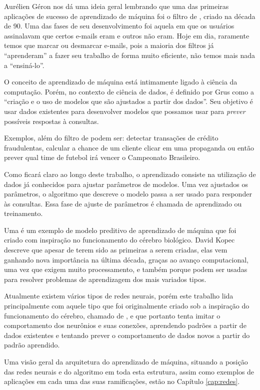 Aurélien Géron \citep{hands} nos dá uma ideia geral lembrando que uma das primeiras aplicações de sucesso de aprendizado de máquina foi o filtro de , criado na década de 90. Uma das fases de seu desenvolvimento foi aquela em que os usuários assinalavam que certos e-mails eram  e outros não eram. Hoje em dia, raramente temos que marcar ou desmarcar e-mails, pois a maioria dos filtros já ``aprenderam'' a fazer seu trabalho de forma muito eficiente, não temos mais nada a ``ensiná-lo''.

O conceito de aprendizado de máquina está intimamente ligado à ciência da computação. Porém, no contexto de ciência de dados, é definido por Grus \citep{data} como a ``criação e o uso de modelos que são ajustados a partir dos dados''. Seu objetivo é usar dados existentes para desenvolver modelos que possamos usar para \emph{prever} possíveis respostas à consultas. 

Exemplos, além do filtro de  podem ser: detectar transações de crédito fraudulentas, calcular a chance de um cliente clicar em uma propaganda ou então prever qual time de futebol irá vencer o Campeonato Brasileiro.

Como ficará claro ao longo deste trabalho, o aprendizado consiste na utilização de dados já conhecidos para ajustar parâmetros de modelos. Uma vez ajustados os parâmetros, o algoritmo que descreve o modelo passa a ser usado para responder às consultas. Essa fase de ajuste de parâmetros é chamada de aprendizado ou treinamento. 

Uma  é um exemplo de modelo preditivo de aprendizado de máquina que foi criado com inspiração no funcionamento do cérebro biológico. David Kopec \citep{classic} descreve que apesar de terem sido as primeiras a serem criadas, elas vem ganhando nova importância na última década, graças ao avanço computacional, uma vez que exigem muito processamento, e também porque podem ser usadas para resolver problemas de aprendizagem dos mais variados tipos.

Atualmente existem vários tipos de redes neurais, porém este trabalho lida principalmente com aquele tipo que foi originalmente criado sob a inspiração do funcionamento do cérebro, chamado de , e que portanto tenta imitar o comportamento dos neurônios e suas conexões, aprendendo padrões a partir de dados existentes e tentando prever o comportamento de dados novos a partir do padrão aprendido.

Uma visão geral da arquitetura do aprendizado de máquina, situando a posição das redes neurais e do algoritmo  em toda esta estrutura, assim como exemplos de aplicações em cada uma das suas ramificações, estão no Capítulo \ref{cap:redes}.

